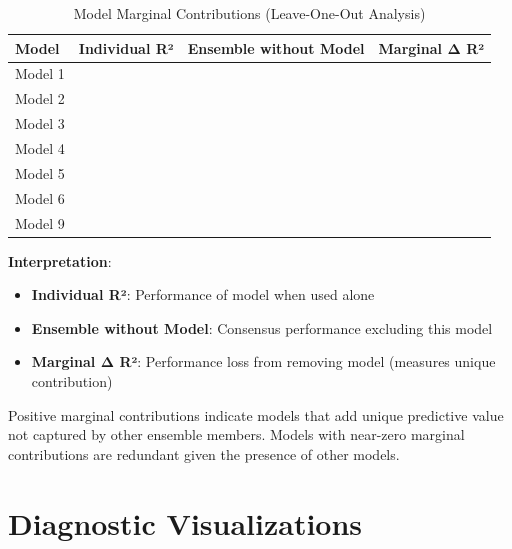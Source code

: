 \begin{table}[h]
\centering
\caption{Model Marginal Contributions (Leave-One-Out Analysis)}
\label{tab:model11_marginal}
\begin{tabular}{lccc}
\toprule
\textbf{Model} & \textbf{Individual R²} & \textbf{Ensemble without Model} & \textbf{Marginal Δ R²} \\
\midrule
Model 1 & \ModelElevenIndivRSquaredOne{} & \ModelElevenWithoutRSquaredOne{} & \ModelElevenContribOne{} \\
Model 2 & \ModelElevenIndivRSquaredTwo{} & \ModelElevenWithoutRSquaredTwo{} & \ModelElevenContribTwo{} \\
Model 3 & \ModelElevenIndivRSquaredThree{} & \ModelElevenWithoutRSquaredThree{} & \ModelElevenContribThree{} \\
Model 4 & \ModelElevenIndivRSquaredFour{} & \ModelElevenWithoutRSquaredFour{} & \ModelElevenContribFour{} \\
Model 5 & \ModelElevenIndivRSquaredFive{} & \ModelElevenWithoutRSquaredFive{} & \ModelElevenContribFive{} \\
Model 6 & \ModelElevenIndivRSquaredSix{} & \ModelElevenWithoutRSquaredSix{} & \ModelElevenContribSix{} \\
Model 9 & \ModelElevenIndivRSquaredNine{} & \ModelElevenWithoutRSquaredNine{} & \ModelElevenContribNine{} \\
\bottomrule
\end{tabular}
\end{table}

\textbf{Interpretation}:
\begin{itemize}
    \item \textbf{Individual R²}: Performance of model when used alone
    \item \textbf{Ensemble without Model}: Consensus performance excluding this model
    \item \textbf{Marginal Δ R²}: Performance loss from removing model (measures unique contribution)
\end{itemize}

Positive marginal contributions indicate models that add unique predictive value not captured by other ensemble members. Models with near-zero marginal contributions are redundant given the presence of other models.

\section{Diagnostic Visualizations}

